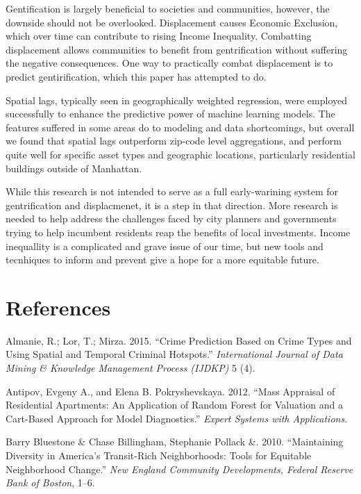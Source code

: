 \documentclass[12pt,]{article}
\begin{document}
Gentification is largely beneficial to societies and communities,
however, the downside should not be overlooked. Displacement causes
Economic Exclusion, which over time can contribute to rising Income
Inequality. Combatting displacement allows communities to benefit from
gentrification without suffering the negative consequences. One way to
practically combat displacement is to predict gentirification, which
this paper has attempted to do.

Spatial lags, typically seen in geographically weighted regression, were
employed successfully to enhance the predictive power of machine
learning models. The features suffered in some areas do to modeling and
data shortcomings, but overall we found that spatial lags outperform
zip-code level aggregations, and perform quite well for specific asset
types and geographic locations, particularly residential buildings
outside of Manhattan.

While this research is not intended to serve as a full early-warining
system for gentrification and displacmenet, it is a step in that
direction. More research is needed to help address the challenges faced
by city planners and governments trying to help incumbent residents reap
the benefits of local investments. Income inequallity is a complicated
and grave issue of our time, but new tools and tecnhiques to inform and
prevent give a hope for a more equitable future.

\newpage

\hypertarget{references}{%
\section*{References}\label{references}}

\hypertarget{refs}{}
\leavevmode\hypertarget{ref-Almanie2015}{}%
Almanie, R.; Lor, T.; Mirza. 2015. ``Crime Prediction Based on Crime
Types and Using Spatial and Temporal Criminal Hotspots.''
\emph{International Journal of Data Mining \& Knowledge Management
Process (IJDKP)} 5 (4).

\leavevmode\hypertarget{ref-antipov12}{}%
Antipov, Evgeny A., and Elena B. Pokryshevskaya. 2012. ``Mass Appraisal
of Residential Apartments: An Application of Random Forest for Valuation
and a Cart-Based Approach for Model Diagnostics.'' \emph{Expert Systems
with Applications}.

\leavevmode\hypertarget{ref-Pollack2010}{}%
Barry Bluestone \& Chase Billingham, Stephanie Pollack \&. 2010.
``Maintaining Diversity in America's Transit-Rich Neighborhoods: Tools
for Equitable Neighborhood Change.'' \emph{New England Community
Developments, Federal Reserve Bank of Boston}, 1--6.
\end{document}
